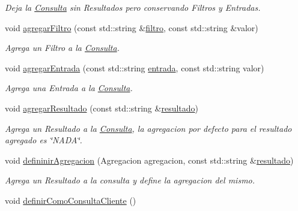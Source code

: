 \begin{DoxyCompactItemize}
\begin{DoxyCompactList}\small\item\em \-Deja la \hyperlink{classConsulta}{\-Consulta} sin \-Resultados pero conservando \-Filtros y \-Entradas. \end{DoxyCompactList}\item 
void \hyperlink{classConsulta_a4df85591716aa2c2ca9f0e305697dcf3}{agregar\-Filtro} (const std\-::string \&\hyperlink{classConsulta_a51966644f6a3fb18e719ba8b10c9f862}{filtro}, const std\-::string \&valor)
\begin{DoxyCompactList}\small\item\em \-Agrega un \-Filtro a la \hyperlink{classConsulta}{\-Consulta}. \end{DoxyCompactList}\item 
void \hyperlink{classConsulta_a78a9d811efd007e8d6d3402123de9494}{agregar\-Entrada} (const std\-::string \hyperlink{classConsulta_a0f8951484349b8b31653615b1ff74bc3}{entrada}, const std\-::string valor)
\begin{DoxyCompactList}\small\item\em \-Agrega una \-Entrada a la \hyperlink{classConsulta}{\-Consulta}. \end{DoxyCompactList}\item 
void \hyperlink{classConsulta_a18c9407b7f8853e18a379ad532e61cd9}{agregar\-Resultado} (const std\-::string \&\hyperlink{classConsulta_acc0fd21c01a4de089670cd5385be4206}{resultado})
\begin{DoxyCompactList}\small\item\em \-Agrega un \-Resultado a la \hyperlink{classConsulta}{\-Consulta}, la agregacion por defecto para el resultado agregado es \char`\"{}\-N\-A\-D\-A\char`\"{}. \end{DoxyCompactList}\item 
void \hyperlink{classConsulta_af9a1f73d3f6120a950cd02068f58893b}{defininir\-Agregacion} (\-Agregacion agregacion, const std\-::string \&\hyperlink{classConsulta_acc0fd21c01a4de089670cd5385be4206}{resultado})
\begin{DoxyCompactList}\small\item\em \-Agrega un \-Resultado a la consulta y define la agregacion del mismo. \end{DoxyCompactList}\item 
\hypertarget{classConsulta_a6020e3a06d8ef8158949ee2d4f6499e0}{void \hyperlink{classConsulta_a6020e3a06d8ef8158949ee2d4f6499e0}{definir\-Como\-Consulta\-Cliente} ()}\label{classConsulta_a6020e3a06d8ef8158949ee2d4f6499e0}


\end{DoxyCompactItemize}
